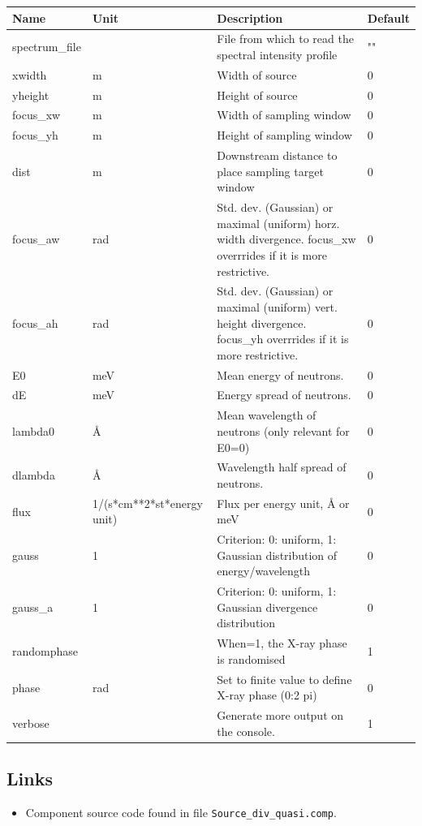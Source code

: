 \begin{longtable}{p{}p{}p{}p{}}
\toprule
\textbf{Name} & \textbf{Unit} & \textbf{Description} & \textbf{Default} \\
\midrule
\endhead
spectrum\_file &   & File from which to read the spectral intensity profile & "" \\
xwidth & m & Width of source & 0 \\
yheight & m & Height of source & 0 \\
focus\_xw & m & Width of sampling window & 0 \\
focus\_yh & m & Height of sampling window & 0 \\
dist & m & Downstream distance to place sampling target window & 0 \\
focus\_aw & rad & Std. dev. (Gaussian) or maximal (uniform) horz. width divergence. focus\_xw overrrides if it is more restrictive. & 0 \\
focus\_ah & rad & Std. dev. (Gaussian) or maximal (uniform) vert. height divergence. focus\_yh overrrides if it is more restrictive. & 0 \\
E0 & meV & Mean energy of neutrons. & 0 \\
dE & meV & Energy spread of neutrons. & 0 \\
lambda0 & \AA{} & Mean wavelength of neutrons (only relevant for E0=0) & 0 \\
dlambda & \AA{} & Wavelength half spread of neutrons. & 0 \\
flux & 1/(s*cm**2*st*energy unit) & Flux per energy unit, \AA{} or meV & 0 \\
gauss & 1 & Criterion: 0: uniform, 1: Gaussian distribution of energy/wavelength & 0 \\
gauss\_a & 1 & Criterion: 0: uniform, 1: Gaussian divergence distribution & 0 \\
randomphase &   & When=1, the X-ray phase is randomised & 1 \\
phase & rad & Set to finite value to define X-ray phase (0:2 pi) & 0 \\
verbose &   & Generate more output on the console. & 1 \\
\bottomrule
\end{longtable}

\subsection*{Links}
\begin{itemize}
  \item Component source code found in file \texttt{Source\_div\_quasi.comp}.
\end{itemize}
